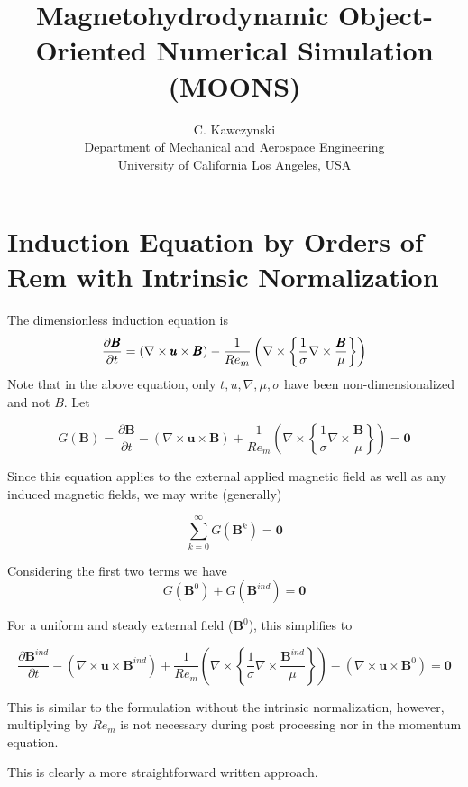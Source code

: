 \documentclass[11pt]{article}
\begin{document}
\doublespacing
\title{Magnetohydrodynamic Object-Oriented Numerical Simulation (MOONS)}
\author{C. Kawczynski \\
Department of Mechanical and Aerospace Engineering \\
University of California Los Angeles, USA\\
}
\maketitle

\section{Induction Equation by Orders of Rem with Intrinsic Normalization}
The dimensionless induction equation is
\begin{equation}
  \label{eq:ind}
  \frac{\partial \pmb{B}}{\partial t} 
  =
  (\nabla \times \pmb{u} \times \pmb{B})
  - \\
  \frac{1}{Re_m}
  \left(
  \nabla \times
  \left\{
  \frac{1}{\sigma}
  \nabla \times
  \frac{\pmb{B}}{\mu}
  \right\}
  \right)
\end{equation}
Note that in the above equation, only $t,u,\nabla , \mu, \sigma$ have been non-dimensionalized and not $B$. Let

\begin{equation}
  G(\pmb{B})
  =
  \frac{\partial \pmb{B}}{\partial t} 
  -
  (\nabla \times \pmb{u} \times \pmb{B})
  +
  \frac{1}{Re_m}
  \left(
  \nabla \times
  \left\{
  \frac{1}{\sigma}
  \nabla \times
  \frac{\pmb{B}}{\mu}
  \right\}
  \right)
  =
  \pmb{0}
\end{equation}

Since this equation applies to the external applied magnetic field as well as any induced magnetic fields, we may write (generally)

\begin{equation}
	\sum_{k=0}^{\infty} G(\pmb{B}^k)
	=
	\pmb{0}
\end{equation}

Considering the first two terms we have
\begin{equation}
  G(\pmb{B}^0)
  +
  G(\pmb{B}^{ind})
  =
  \pmb{0}
\end{equation}

For a uniform and steady external field ($\pmb{B}^0$), this simplifies to


\begin{equation}
  \frac{\partial \pmb{B}^{ind}}{\partial t} 
  -
  (\nabla \times \pmb{u} \times \pmb{B}^{ind})
  +
  \frac{1}{Re_m}
  \left(
  \nabla \times
  \left\{
  \frac{1}{\sigma}
  \nabla \times
  \frac{\pmb{B}^{ind}}{\mu}
  \right\}
  \right)
  -
  (\nabla \times \pmb{u} \times \pmb{B}^0)
  =
  \pmb{0}
\end{equation}

This is similar to the formulation without the intrinsic normalization, however, multiplying by $Re_m$ is not necessary during post processing nor in the momentum equation.

This is clearly a more straightforward written approach.
\end{document}
